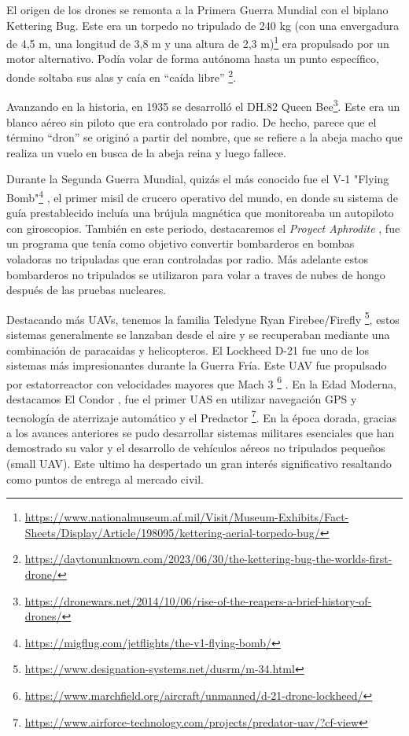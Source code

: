 El origen de los drones se remonta a la Primera Guerra Mundial con el biplano Kettering Bug.
Este era un torpedo no tripulado de 240 kg (con una envergadura de 4,5 m, una longitud de
3,8 m y una altura de 2,3 m)\footnote{\url{https://www.nationalmuseum.af.mil/Visit/Museum-Exhibits/Fact-Sheets/Display/Article/198095/kettering-aerial-torpedo-bug/}} era propulsado por un motor alternativo. Podía volar de
forma autónoma hasta un punto específico, donde soltaba sus alas y caía en “caída libre” \footnote{\url{https://daytonunknown.com/2023/06/30/the-kettering-bug-the-worlds-first-drone/}}.\newline

Avanzando en la historia, en 1935 se desarrolló el DH.82 Queen Bee\footnote{\url{https://dronewars.net/2014/10/06/rise-of-the-reapers-a-brief-history-of-drones/}}. Este era un blanco aéreo sin piloto que era controlado por radio. De hecho, parece que el término “dron” se originó a partir del nombre, que se refiere a la abeja macho que realiza un vuelo en busca de la abeja reina y luego fallece. \newline

Durante la Segunda Guerra Mundial, quizás el más conocido fue el V-1 "Flying Bomb"\footnote{\url{https://migflug.com/jetflights/the-v1-flying-bomb/}} , el primer misil
de crucero operativo del mundo, en donde su sistema de guía prestablecido incluía una brújula magnética que monitoreaba un autopiloto con giroscopios. También en este periodo, destacaremos el \textit{Proyect Aphrodite} \cite{Aphrodite}, fue un programa que tenía como objetivo convertir bombarderos en bombas voladoras no tripuladas que eran controladas por radio. Más adelante estos bombarderos no tripulados se utilizaron para volar a traves de nubes de hongo
después de las pruebas nucleares. \newline

Destacando más UAVs, tenemos la familia Teledyne Ryan Firebee/Firefly \footnote{\url{https://www.designation-systems.net/dusrm/m-34.html}}, estos sistemas generalmente se lanzaban desde el aire y se recuperaban mediante una combinación de paracaidas y helicopteros. El Lockheed D-21 fue uno de los sistemas más impresionantes durante la Guerra Fría. Este UAV fue propulsado por estatorreactor con velocidades mayores que Mach 3 \footnote{\url{https://www.marchfield.org/aircraft/unmanned/d-21-drone-lockheed/}} . En la Edad Moderna, destacamos El Condor \cite{CondorUAV}, fue el primer UAS en utilizar navegación GPS y tecnología de aterrizaje automático y el Predactor \footnote{\url{https://www.airforce-technology.com/projects/predator-uav/?cf-view}}. 
En la época dorada, gracias a los avances anteriores se pudo desarrollar sistemas militares esenciales que han demostrado su valor y el desarrollo de vehículos aéreos no tripulados pequeños (small UAV). Este ultimo ha despertado un gran interés significativo resaltando como puntos de entrega al mercado civil. \newline


